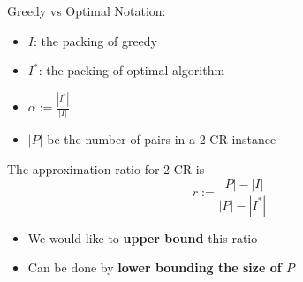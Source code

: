 \begin{frame}{Greedy vs Optimal}
Notation:
\begin{itemize}
\pause\item
\textbf{$I$}: the packing of greedy

\pause\item
\textbf{$I^*$}: the packing of optimal algorithm

\pause\item
$\alpha := \frac{|I^*|}{|I|}$ 

\pause\item
$|P|$ be the number of pairs in a 2-CR instance

\end{itemize}

\pause
\begin{observation}
The approximation ratio for 2-CR is
$$ r := \frac{|P| - |I|}{|P| - |I^*|} $$
\end{observation}

\begin{itemize}
\pause\item
We would like to \textbf{upper bound} this ratio
\pause\item
Can be done by \textbf{lower bounding the size of $P$}
\end{itemize}


\end{frame}